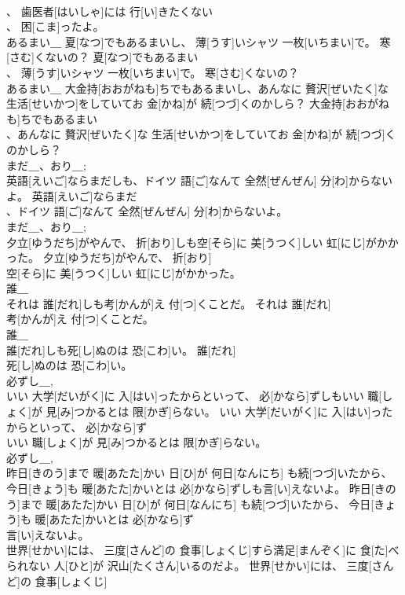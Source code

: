 \documentclass[8pt]{extreport}
\begin{document}
\begin{CJK}{UTF8}{min}
\\	、 歯医者[はいしゃ]には 行[い]きたくない
\\	、 困[こま]ったよ。	
\\	あるまい＿	夏[なつ]でもあるまいし、 薄[うす]いシャツ 一枚[いちまい]で。 寒[さむ]くないの？	夏[なつ]でもあるまい
\\	、 薄[うす]いシャツ 一枚[いちまい]で。 寒[さむ]くないの？	
\\	あるまい＿	大金持[おおがねも]ちでもあるまいし、あんなに 贅沢[ぜいたく]な 生活[せいかつ]をしていてお 金[かね]が 続[つづ]くのかしら？	大金持[おおがねも]ちでもあるまい
\\	、あんなに 贅沢[ぜいたく]な 生活[せいかつ]をしていてお 金[かね]が 続[つづ]くのかしら？	
\\	まだ＿、おり＿; 
\\	英語[えいご]ならまだしも、ドイツ 語[ご]なんて 全然[ぜんぜん] 分[わ]からないよ。	英語[えいご]ならまだ
\\	、ドイツ 語[ご]なんて 全然[ぜんぜん] 分[わ]からないよ。	
\\	まだ＿、おり＿; 
\\	夕立[ゆうだち]がやんで、 折[おり]しも空[そら]に 美[うつく]しい 虹[にじ]がかかった。	夕立[ゆうだち]がやんで、 折[おり]
\\	空[そら]に 美[うつく]しい 虹[にじ]がかかった。	
\\	誰＿ 
\\	それは 誰[だれ]しも考[かんが]え 付[つ]くことだ。	それは 誰[だれ]
\\	考[かんが]え 付[つ]くことだ。	
\\	誰＿ 
\\	誰[だれ]しも死[し]ぬのは 恐[こわ]い。	誰[だれ]
\\	死[し]ぬのは 恐[こわ]い。	
\\	必ずし＿, 
\\	いい 大学[だいがく]に 入[はい]ったからといって、 必[かなら]ずしもいい 職[しょく]が 見[み]つかるとは 限[かぎ]らない。	いい 大学[だいがく]に 入[はい]ったからといって、 必[かなら]ず
\\	いい 職[しょく]が 見[み]つかるとは 限[かぎ]らない。	
\\	必ずし＿, 
\\	昨日[きのう]まで 暖[あたた]かい 日[ひ]が 何日[なんにち] も続[つづ]いたから、 今日[きょう]も 暖[あたた]かいとは 必[かなら]ずしも言[い]えないよ。	昨日[きのう]まで 暖[あたた]かい 日[ひ]が 何日[なんにち] も続[つづ]いたから、 今日[きょう]も 暖[あたた]かいとは 必[かなら]ず
\\	言[い]えないよ。	
\\	世界[せかい]には、 三度[さんど]の 食事[しょくじ]すら満足[まんぞく]に 食[た]べられない 人[ひと]が 沢山[たくさん]いるのだよ。	世界[せかい]には、 三度[さんど]の 食事[しょくじ]

\end{CJK}
\end{document}
